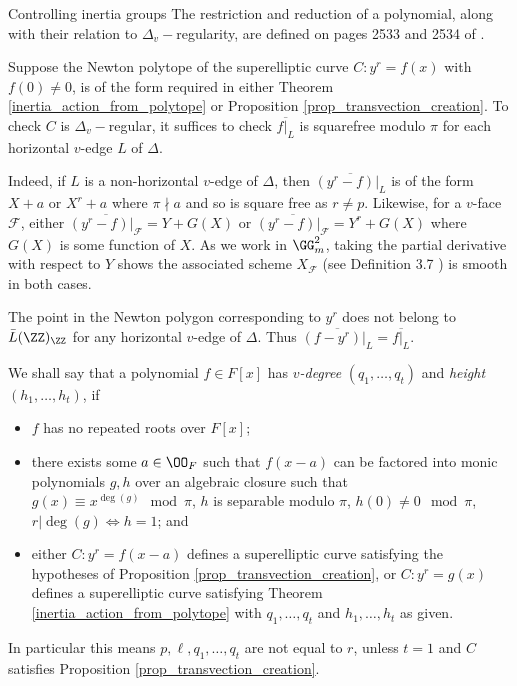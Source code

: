 \documentclass[11pt,a4paper]{article}
\newcommand{\Dv}{\Delta_v}
\newcommand{\D}{\Delta}
\newcommand{\F}{\mathcal{F}}
\begin{document}
\begin{section}{Controlling inertia groups}
The restriction and reduction of a polynomial, along with their relation to $\Dv-$regularity, are defined on pages 2533 and 2534 of \cite{Models_Curves_DVR}.

\begin{remark}
Suppose the Newton polytope of the superelliptic curve $C \colon y^r=f(x)$ with $f(0)\neq 0$, is of the form required in either Theorem \ref{inertia_action_from_polytope} or Proposition \ref{prop_transvection_creation}. To check $C$ is $\Dv-$regular, it suffices to check $\overline{f|_L}$ is squarefree modulo $\pi$ for each horizontal $v$-edge $L$ of $\Delta$.

Indeed, if $L$ is a non-horizontal $v$-edge of $\D$, then $\overline{(y^r-f)|_L}$ is of the form $ X + a$ or $X^r+a$ where $\pi \nmid a$ and so is square free as $r \neq p$.
Likewise, for a $v$-face $\F$, either $\overline{(y^r-f)|_\F} = Y + G(X)$ or $\overline{(y^r-f)|_\F} = Y^r + G(X)$ where $G(X)$ is some function of $X$. As we work in $\GG_m^2$, taking the partial derivative with respect to $Y$ shows the associated scheme $X_\F$ (see Definition 3.7 \cite{Models_Curves_DVR}) is smooth in both cases.

The point in the Newton polygon corresponding to $y^r$ does not belong to ${\bar L(\ZZ)_{\ZZ}}$ for any horizontal $v$-edge of $\D$. Thus $\overline{(f-y^r)|_L} = \overline{f|_L}$.
\end{remark}


\begin{definition}
We shall say that a polynomial $f\in F[x]$ has \emph{$v$-degree} $(q_1, \ldots, q_t)$ and \emph{height} $(h_1, \ldots, h_t)$, if
\begin{itemize}
    \item $f$ has no repeated roots over $F[x]$;
    \item there exists some $a \in \OO_F$ such that $f(x-a)$ can be factored into monic polynomials $g,h$ over an algebraic closure such that $g(x) \equiv x^{\deg(g)} \mod{\pi}$, $h$ is separable modulo $\pi$, $h(0) \neq 0 \mod{\pi}$, $r|\deg(g) \iff h=1$; and
    \item either $C\colon y^r=f(x-a)$ defines a superelliptic curve satisfying the hypotheses of Proposition \ref{prop_transvection_creation}, or $C\colon y^r=g(x)$ defines a superelliptic curve satisfying Theorem \ref{inertia_action_from_polytope} with $q_1,\ldots, q_t$ and $h_1,\ldots,h_t$ as given.
\end{itemize}
In particular this means $p,\ell,q_1, \ldots ,q_t$ are not equal to $r$, unless $t=1$ and $C$ satisfies Proposition \ref{prop_transvection_creation}.


\end{definition}
\end{section}
\end{document}
